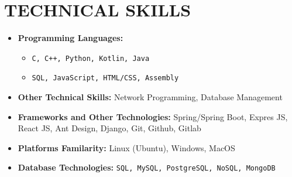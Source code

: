 \section{TECHNICAL SKILLS}

\begin{multicols}{2}
  \begin{itemize}[leftmargin=0.25in, itemsep=1pt]
    
    \item \textbf{Programming Languages:} 
      \begin{itemize}[label={-}, leftmargin=0.2in]
        \item \texttt{C, C++, Python, Kotlin, Java}
        \item \texttt{SQL, JavaScript, HTML/CSS, Assembly}
      \end{itemize}
      
    \item \textbf{Other Technical Skills:}
      Network Programming, Database Management
      
  \end{itemize}
  \vspace{\fill}
  \begin{itemize}[leftmargin=0.25in, itemsep=1pt]
    \item \textbf{Frameworks and Other Technologies:}
      Spring/Spring Boot, Expres JS, React JS, Ant Design, Django, Git, Github, Gitlab
    
    \item \textbf{Platforms Familarity:}
      Linux (Ubuntu), Windows, MacOS
    
    \item \textbf{Database Technologies:} 
      \texttt{SQL, MySQL, PostgreSQL, NoSQL, MongoDB}
  \end{itemize}
\end{multicols}
